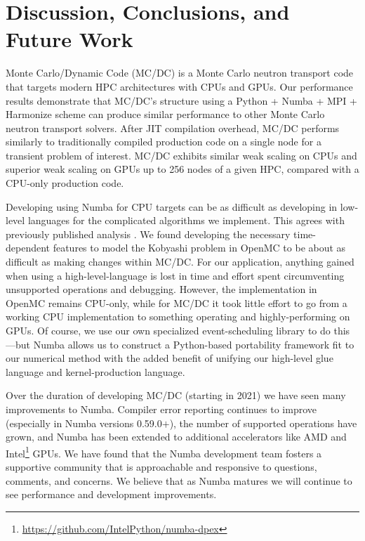 \section{Discussion, Conclusions, and Future Work}

Monte Carlo/Dynamic Code (MC/DC) is a Monte Carlo neutron transport code that targets modern HPC architectures with CPUs and GPUs.
Our performance results demonstrate that MC/DC's structure using a Python + Numba + MPI + Harmonize scheme can produce similar performance to other Monte Carlo neutron transport solvers.
After JIT compilation overhead, MC/DC performs similarly to traditionally compiled production code on a single node for a transient problem of interest.
MC/DC exhibits similar weak scaling on CPUs and superior weak scaling on GPUs up to 256 nodes of a given HPC, compared with a CPU-only production code.

Developing using Numba for CPU targets can be as difficult as developing in low-level languages for the complicated algorithms we implement. 
This agrees with previously published analysis \cite{KailasaSrinath2022PAEi}.
We found developing the necessary time-dependent features to model the Kobyashi problem in OpenMC to be about as difficult as making changes within MC/DC.
For our application, anything gained when using a high-level-language is lost in time and effort spent circumventing unsupported operations and debugging. 
However, the implementation in OpenMC remains CPU-only, while for MC/DC it took little effort to go from a working CPU implementation to something operating and highly-performing on GPUs.
Of course, we use our own specialized event-scheduling library to do this---but Numba allows us to construct a Python-based portability framework fit to our numerical method with the added benefit of unifying our high-level glue language and kernel-production language.

Over the duration of developing MC/DC (starting in 2021) we have seen many improvements to Numba.
Compiler error reporting continues to improve (especially in Numba versions 0.59.0$+$), the number of supported operations have grown, and Numba has been extended to additional accelerators like AMD and Intel\footnote{\url{https://github.com/IntelPython/numba-dpex}} GPUs.
We have found that the Numba development team fosters a supportive community that is approachable and responsive to questions, comments, and concerns.
We believe that as Numba matures we will continue to see performance and development improvements.

